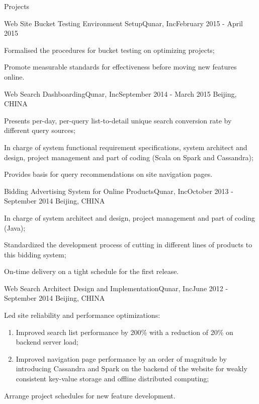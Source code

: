 \documentclass{resume} %
\begin{document}
\begin{rSection}{Projects}

\begin{rSubsection}{Web Site Bucket Testing Environment Setup}{Qunar, Inc}{February 2015 - April 2015}

\item Formalised the procedures for bucket testing on optimizing projects;
\item Promote measurable standards for effectiveness before moving new features online.

\end{rSubsection}

\begin{rSubsection}{Web Search Dashboarding}{Qunar, Inc}{September 2014 - March 2015}
{Beijing, CHINA}
\item Presents per-day, per-query list-to-detail unique search conversion rate by different query sources;
\item In charge of system functional requirement specifications, system architect and design, project management and part of coding (Scala on Spark and Cassandra);
\item Provides basis for query recommendations on site navigation pages.
\end{rSubsection}

\begin{rSubsection}{Bidding Advertising System for Online Products}{Qunar, Inc}{October 2013 - September 2014}
{Beijing, CHINA}
\item In charge of system architect and design, project management and part of coding (Java);
\item Standardized the development process of cutting in different lines of products to this bidding system;
\item On-time delivery on a tight schedule for the first release.
\end{rSubsection}

\begin{rSubsection}{Web Search Architect Design and Implementation}{Qunar, Inc}{June 2012 - September 2014}
{Beijing, CHINA}
\item Led site reliability and performance optimizations:
  \begin{enumerate}
    \item Improved search list performance by 200\% with a reduction of 20\% on backend server load;
    \item Improved navigation page performance by an order of magnitude by introducing Cassandra and Spark on the backend of the website for weakly consistent key-value storage and offline distributed computing;
  \end{enumerate}
\item Arrange project schedules for new feature development.


\end{rSubsection}
\end{rSection}
\end{document}
